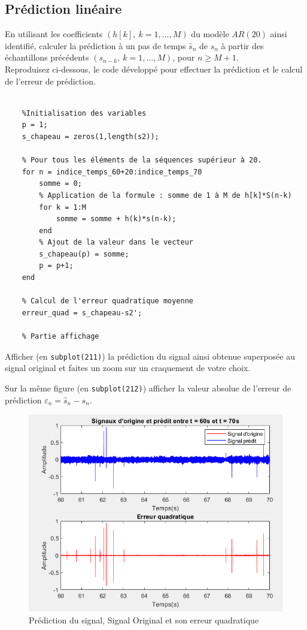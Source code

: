 \documentclass{article}
\begin{document}
\subsection{Prédiction linéaire}
\label{sec:predlin}

En utilisant les coefficients $(h[k],~k=1,\ldots,M)$ du modèle $AR(20)$ ainsi identifié, calculer la prédiction à un pas de temps $\hat{s}_n$ de $s_n$ à partir des échantillons précédents $(s_{n-k},~k=1,\ldots,M)$, pour $n \geq M+1$.\\[1mm]
Reproduisez ci-dessous, le code développé pour effectuer la prédiction et le calcul de l'erreur de prédiction.
\begin{verbatim}

    %Initialisation des variables
    p = 1;
    s_chapeau = zeros(1,length(s2));
    
    % Pour tous les éléments de la séquences supérieur à 20. 
    for n = indice_temps_60+20:indice_temps_70
        somme = 0;
        % Application de la formule : somme de 1 à M de h[k]*S(n-k)
        for k = 1:M
            somme = somme + h(k)*s(n-k);
        end
        % Ajout de la valeur dans le vecteur
        s_chapeau(p) = somme;
        p = p+1;
    end
    
    % Calcul de l'erreur quadratique moyenne
    erreur_quad = s_chapeau-s2';
    
    % Partie affichage
\end{verbatim}
 
Afficher (en {\tt subplot(211)}) la prédiction du signal ainsi obtenue superposée au  signal original et faites un zoom sur un craquement de votre choix.

Sur la même figure (en {\tt subplot(212)}) afficher la valeur absolue de l'erreur de prédiction $\varepsilon_n = \hat{s}_n - s_n$.

\begin{figure}[!h]
    \centering
    \includegraphics[width=1\textwidth]{images/global.png}
    \caption{Prédiction du signal, Signal Original et son erreur quadratique }
    \label{fig-binaire}
\end{figure}
\clearpage
\end{document}
